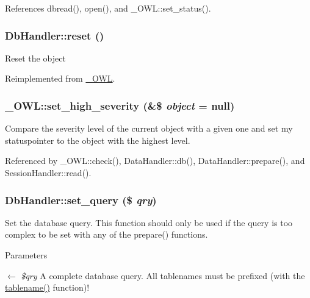 References dbread(), open(), and \_\-OWL::set\_\-status().

\subsubsection[{reset}]{\setlength{\rightskip}{0pt plus 5cm}DbHandler::reset ()}\label{classDbHandler_a9982df4830f05803935bb31bac7fae3d}
Reset the object 

Reimplemented from \hyperlink{class__OWL_a2f2a042bcf31965194c03033df0edc9b}{\_\-OWL}.

\subsubsection[{set\_\-high\_\-severity}]{\setlength{\rightskip}{0pt plus 5cm}\_\-OWL::set\_\-high\_\-severity (\&\$ {\em object} = {\ttfamily null})}\label{class__OWL_a576829692a3b66e3d518853bf43abae3}
Compare the severity level of the current object with a given one and set my statuspointer to the object with the highest level. 

Referenced by \_\-OWL::check(), DataHandler::db(), DataHandler::prepare(), and SessionHandler::read().

\subsubsection[{set\_\-query}]{\setlength{\rightskip}{0pt plus 5cm}DbHandler::set\_\-query (\$ {\em qry})}\label{classDbHandler_a305a3225c4760a88a06b0d55d0893962}
Set the database query. This function should only be used if the query is too complex to be set with any of the prepare() functions.


\begin{DoxyParams}{Parameters}
\item[\mbox{$\leftarrow$} {\em \$qry}]A complete database query. All tablenames must be prefixed (with the \hyperlink{classDbHandler_abaca15a312800e5522b3efd9dff036f5}{tablename()} function)! \end{DoxyParams}
